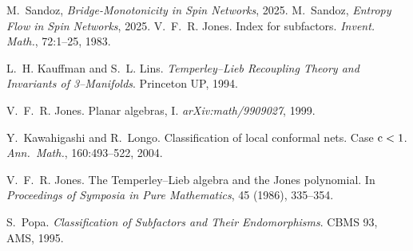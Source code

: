 \documentclass[11pt]{article}
\begin{document}

\begin{thebibliography}{9}
 M.~Sandoz, \emph{Bridge-Monotonicity in Spin Networks}, 2025.
 M.~Sandoz, \emph{Entropy Flow in Spin Networks}, 2025.
V.~F.~R. Jones.
\newblock Index for subfactors.
\newblock \emph{Invent. Math.}, 72:1–25, 1983.

L.~H. Kauffman and S.~L. Lins.
\newblock \emph{Temperley–Lieb Recoupling Theory and Invariants of 3–Manifolds}.
\newblock Princeton UP, 1994.

V.~F.~R. Jones.
\newblock Planar algebras, I.
\newblock \emph{arXiv:math/9909027}, 1999.

Y.~Kawahigashi and R.~Longo.
\newblock Classification of local conformal nets.  Case ${\rm c}<1$.
\newblock \emph{Ann.\ Math.}, 160:493–522, 2004.

V.~F.~R. Jones.
\newblock The Temperley–Lieb algebra and the Jones polynomial.
\newblock In \emph{Proceedings of Symposia in Pure Mathematics}, 45 (1986), 335–354.

S.~Popa.
\newblock \emph{Classification of Subfactors and Their Endomorphisms}.
\newblock CBMS 93, AMS, 1995.


\end{thebibliography}
\end{document}
